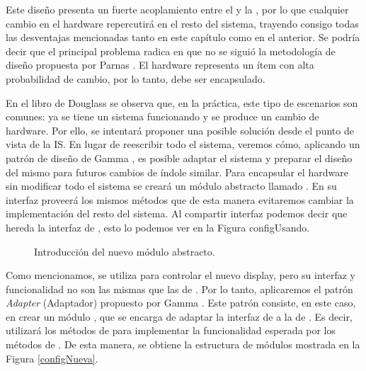 Este diseño presenta un fuerte acoplamiento entre el \Cliente y la \LibAcme, por lo que cualquier cambio en el hardware repercutirá en el resto del sistema, trayendo consigo todas las desventajas mencionadas tanto en este capítulo como en el anterior. Se podría decir que el principal problema radica en que no se siguió la metodología de diseño propuesta por Parnas \cite{Parnas1972}. El hardware representa un ítem con alta probabilidad de cambio, por lo tanto, debe ser encapsulado.

En el libro de Douglass \cite{douglass} se observa que, en la práctica, este tipo de escenarios son comunes: ya se tiene un sistema funcionando y se produce un cambio de hardware. Por ello, se intentará proponer una posible solución desde el punto de vista de la \gls{IS}. En lugar de reescribir todo el sistema, veremos cómo, aplicando un patrón de diseño de Gamma \cite{Gamma:1995:DPE:186897}, es posible adaptar el sistema y preparar el diseño del mismo para futuros cambios de índole similar.
Para encapsular el hardware sin modificar todo el sistema se creará un módulo abstracto llamado \Display. En su interfaz proveerá los mismos métodos que \LibAcme de esta manera evitaremos cambiar la implementación del resto del sistema. Al compartir interfaz podemos decir que \LibAcme hereda la interfaz de \Display, esto lo podemos ver en la Figura {configUsando}.

\begin{figure}[H]
\caption{Introducción del nuevo módulo abstracto\Display.}
\label{configUsando}
\begin{center}
\end{center}
\end{figure}
Como mencionamos, \LibEmca se utiliza para controlar el nuevo display, pero su interfaz y funcionalidad no son las mismas que las de \LibAcme. Por lo tanto, aplicaremos el patrón \textit{Adapter} (Adaptador) propuesto por Gamma \cite{Gamma:1995:DPE:186897}. Este patrón consiste, en este caso, en crear un módulo \DisplayEmca, que se encarga de adaptar la interfaz de \LibEmca a la de \Display. Es decir, utilizará los métodos de \LibEmca para implementar la funcionalidad esperada por los métodos de \Display. De esta manera, se obtiene la estructura de módulos mostrada en la Figura \ref{configNueva}.

